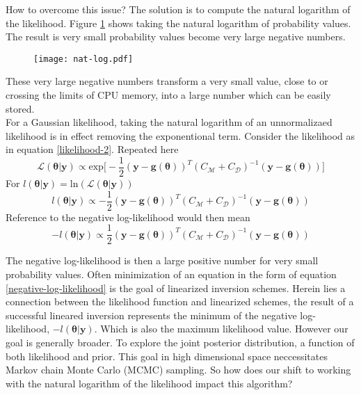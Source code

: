 \begin{tcolorbox}[enhanced jigsaw,breakable,pad at break*=1mm,title=Technical figure 3: Stable computation of likelihood values, title filled,fonttitle=\sffamily\bfseries,fontupper=\sffamily\scriptsize]
\begin{multicols}{2}
How to overcome this issue? The solution is to compute the natural logarithm of the likelihood. Figure \ref{nat-log} shows taking the natural logarithm of probability values. The result is very small probability values become very large negative numbers.

\begin{figure}[H]
	\centering
	\texttt{[image: nat-log.pdf]}
	\label{nat-log}
\end{figure}

These very large negative numbers transform a very small value, close to or crossing the limits of CPU memory, into a large number which can be easily stored. \\

For a Gaussian likelihood, taking the natural logarithm of an unnormalizaed likelihood is in effect removing the exponentional term. Consider the likelihood as in equation \ref{likelihood-2}. Repeated here
\begin{equation}
\mathcal{L}(\bm{\theta}|\bm{y}) \propto \text{exp}\bigg[-\frac{1}{2}(\bm{y}-\bm{g}(\bm{\theta}))^T(C_{\mathcal{M}}+C_{\mathcal{D}})^{-1}(\bm{y}-\bm{g}(\bm{\theta}))\bigg]
\label{repeat-likelihood-2}
\end{equation}
For $l(\bm{\theta}|\bm{y}) = \text{ln}(\mathcal{L}(\bm{\theta}|\bm{y}))$
\begin{equation}
l(\bm{\theta}|\bm{y}) \propto -\frac{1}{2}(\bm{y}-\bm{g}(\bm{\theta}))^T(C_{\mathcal{M}}+C_{\mathcal{D}})^{-1}(\bm{y}-\bm{g}(\bm{\theta}))
\label{log-likelihood}
\end{equation}
Reference to the negative log-likelihood would then mean
\begin{equation}
-l(\bm{\theta}|\bm{y}) \propto \frac{1}{2}(\bm{y}-\bm{g}(\bm{\theta}))^T(C_{\mathcal{M}}+C_{\mathcal{D}})^{-1}(\bm{y}-\bm{g}(\bm{\theta}))
\label{negative-log-likelihood}
\end{equation}

The negative log-likelihood is then a large positive number for very small probability values. Often minimization of an equation in the form of equation \ref{negative-log-likelihood} is the goal of linearized inversion schemes. Herein lies a connection between the likelihood function and linearized schemes, the result of a successful lineared inversion represents the minimum of the negative log-likelihood, $-l(\bm{\theta}|\bm{y})$. Which is also the maximum likelihood value. However our goal is generally broader. To explore the joint posterior distribution, a function of both likelihood and prior. This goal in high dimensional space neccessitates Markov chain Monte Carlo (MCMC) sampling. So how does our shift to working with the natural logarithm of the likelihood impact this algorithm? \\


\end{multicols}
\end{tcolorbox}
